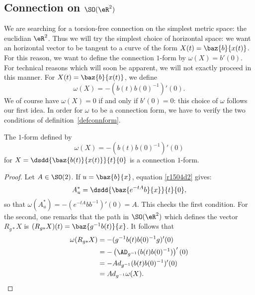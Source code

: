 \subsection{Connection on \texorpdfstring{$\SO(\eR^2)$}{SO(R2)}}

We are searching for a torsion-free connection on the simplest metric space: the euclidian $\eR^2$. Thus we will try the simplest choice of horizontal space: we want an horizontal vector to be tangent to a curve of the form $X(t)=\baz{b}{x(t)}$. For this reason, we want to define the connection $1$-form by $\omega(X)=b'(0)$. For technical reasons which will soon be apparent, we will not exactly proceed in this manner. For $X(t)=\baz{b}{x(t)}$, we define
\begin{equation}
                       \omega(X)=-(b(t)b(0)^{-1})'(0).
\end{equation}
We of course have $\omega(X)=0$ if and only if $b'(0)=0$: this choice of $\omega$ follows our first idea. In order for $\omega$ to be a connection form, we have to verify the two conditions of definition~\ref{defconnform}.

\begin{proposition}
The $1$-form defined by
\[
              \omega(X)=-(b(t)b(0)^{-1})'(0)
\]
for $X=\displaystyle\dsdd{\baz{b(t)}{x(t)}}{t}{0}$ is a connection $1$-form.
\end{proposition}

\begin{proof}
Let $A\in \SO(2)$. If $u=\baz{b}{x}$, equation \eqref{r1504d2} gives:
\[
   A^*_u=\dsdd{\baz{e^{-tA}b}{x}}{t}{0},
\]
 so that $\omega(A^*_u)=-(e^{-tA}bb^{-1})'(0)=A$. This checks the first condition. For the second, one remarks that the path in $\SO(\eR^2)$ which defines the vector $R_{g*}X$ is $(R_{g*}X)(t)=\baz{g^{-1} b(t)}{x}$. It follows that
\begin{equation}
\begin{split}
\omega(R_{g*}X)&=-(g^{-1} b(t)b(0)^{-1} g)'(0)\\
               &=-\left(\AD_{g^{-1}}(b(t)b(0)^{-1})\right)'(0)\\
               &=-Ad_{g^{-1}}(b(t)b(0)^{-1})'(0)\\
               &=Ad_{g^{-1}}\omega(X).
\end{split}
\end{equation}

\end{proof}

